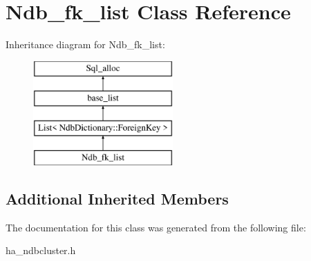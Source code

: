 \hypertarget{classNdb__fk__list}{}\section{Ndb\+\_\+fk\+\_\+list Class Reference}
\label{classNdb__fk__list}
Inheritance diagram for Ndb\+\_\+fk\+\_\+list\+:\begin{figure}[H]
\begin{center}
\leavevmode
\includegraphics[height=4.000000cm]{classNdb__fk__list}
\end{center}
\end{figure}
\subsection*{Additional Inherited Members}


The documentation for this class was generated from the following file\+:\begin{DoxyCompactItemize}
\item 
ha\+\_\+ndbcluster.\+h\end{DoxyCompactItemize}
